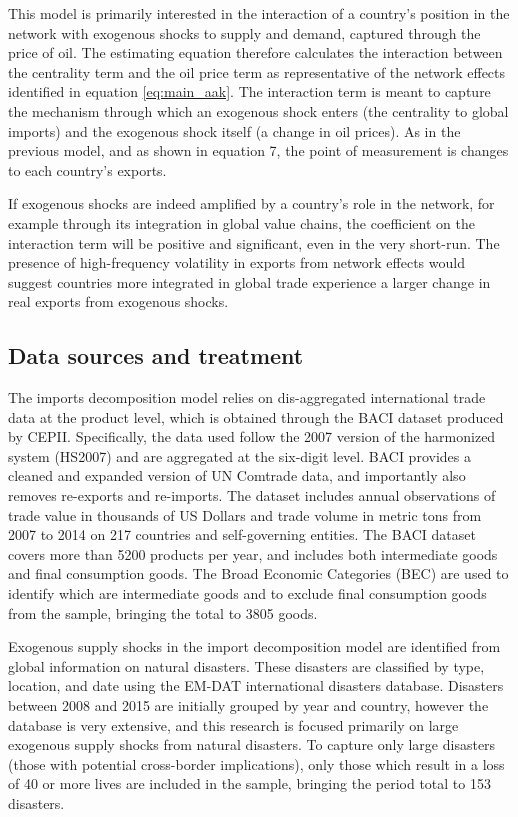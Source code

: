 \documentclass[10pt,letterpaper]{article}
\begin{document}
This model is primarily interested in the interaction of a country's position in the network with exogenous shocks to supply and demand, captured through the price of oil. The estimating equation therefore calculates the interaction between the centrality term and the oil price term as representative of the network effects identified in equation \ref{eq:main_aak}. The interaction term is meant to capture the mechanism through which an exogenous shock enters (the centrality to global imports) and the exogenous shock itself (a change in oil prices). As in the previous model, and as shown in equation 7, the point of measurement is changes to each country's exports. 

If exogenous shocks are indeed amplified by a country's role in the network, for example through its integration in global value chains, the coefficient on the interaction term will be positive and significant, even in the very short-run. The presence of high-frequency volatility in exports from network effects would suggest countries more integrated in global trade experience a larger change in real exports from exogenous shocks.

\subsection{Data sources and treatment} \label{data_sources}
The imports decomposition model relies on dis-aggregated international trade data at the product level, which is obtained through the BACI dataset produced by CEPII. Specifically, the data used follow the 2007 version of the harmonized system (HS2007) and are aggregated at the six-digit level. BACI provides a cleaned and expanded version of UN Comtrade data, and importantly also removes re-exports and re-imports. The dataset includes annual observations of trade value in thousands of US Dollars and trade volume in metric tons from 2007 to 2014 on 217 countries and self-governing entities. The BACI dataset covers more than 5200 products per year, and includes both intermediate goods and final consumption goods. The Broad Economic Categories (BEC) are used to identify which are intermediate goods and to exclude final consumption goods from the sample, bringing the total to 3805 goods. 

Exogenous supply shocks in the import decomposition model are identified from global information on natural disasters. These disasters are classified by type, location, and date using the EM-DAT international disasters database. Disasters between 2008 and 2015 are initially grouped by year and country, however the database is very extensive, and this research is focused primarily on large exogenous supply shocks from natural disasters. To capture only large disasters (those with potential cross-border implications), only those which result in a loss of 40 or more lives are included in the sample, bringing the period total to 153 disasters.
\end{document}
